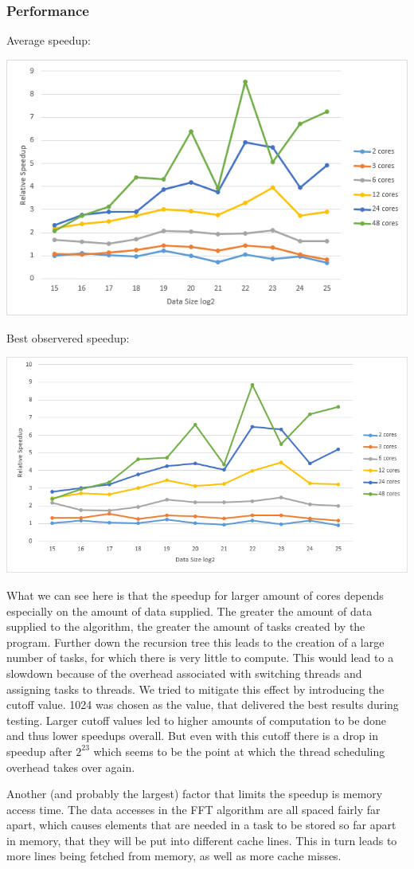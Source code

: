 \subsubsection{Performance}

Average speedup:

\includegraphics[width=\textwidth]{omp_rec_avg.png}

\pagebreak
Best observered speedup:

\includegraphics[width=\textwidth]{omp_rec_best.png}

What we can see here is that the speedup for larger amount of cores depends especially on the amount of data supplied.
The greater the amount of data supplied to the algorithm, the greater the amount of tasks created by the program. Further down the recursion tree this leads to the creation of
a large number of tasks, for which there is very little to compute. This would lead to a slowdown because of the overhead associated with switching threads and assigning tasks to threads.
We tried to mitigate this effect by introducing the cutoff value. 1024 was chosen as the value, that delivered the best results during testing. Larger cutoff values led to higher amounts of computation to be done and thus lower speedups overall.
But even with this cutoff there is a drop in speedup after \(2^{23}\) which seems to be the point at which the thread scheduling overhead takes over again.

Another (and probably the largest) factor that limits the speedup is memory access time. The data accesses in the FFT algorithm are all spaced fairly far apart, which causes elements that are needed in a task to be stored so far apart in memory,
that they will be put into different cache lines. This in turn leads to more lines being fetched from memory, as well as more cache misses.

